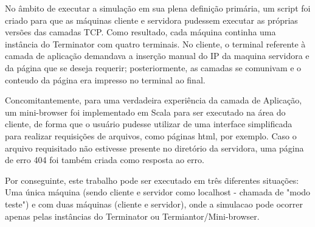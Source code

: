 \documentclass[11pt]{article}
\begin{document}
		No âmbito de executar a simulação em sua plena definição primária, um script foi criado para que as máquinas cliente e servidora pudessem executar as próprias versões das camadas TCP. Como resultado, cada máquina continha uma instância do Terminator com quatro terminais. No cliente, o terminal referente à camada de aplicação demandava a inserção manual do IP da maquina servidora e da página que se deseja requerir; posteriormente, as camadas se comunivam e o conteudo da página era impresso no terminal ao final.
		
		Concomitantemente, para uma verdadeira experiência da camada de Aplicação, um mini-browser foi implementado em Scala para ser executado na área do cliente, de forma que o usuário pudesse utilizar de uma interface simplificada para realizar requisições de arquivos, como páginas html, por exemplo. Caso o arquivo requisitado não estivesse presente no diretório da servidora, uma página de erro 404 foi também criada como resposta ao erro.
		
		Por conseguinte, este trabalho pode ser executado em três diferentes situações: Uma única máquina (sendo cliente e servidor como localhost - chamada de "modo teste") e com duas máquinas (cliente e servidor), onde a simulacao pode ocorrer apenas pelas instâncias do Terminator ou Termiantor/Mini-browser.                        
\end{document}

